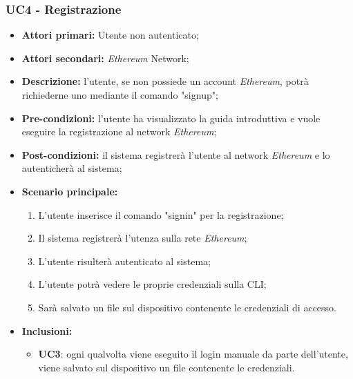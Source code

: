 \subsubsection{UC4 - Registrazione}
\begin{itemize}
	\item \textbf{Attori primari:} Utente non autenticato;
	\item \textbf{Attori secondari:} \textit{Ethereum\glo} Network;
	\item \textbf{Descrizione:} l'utente, se non possiede un account \textit{Ethereum\glos}, potrà richiederne uno mediante il comando "signup"; 
	\item \textbf{Pre-condizioni:} l'utente ha visualizzato la guida introduttiva e vuole eseguire la registrazione al network \textit{Ethereum};
	\item \textbf{Post-condizioni:} il sistema registrerà l'utente al network \textit{Ethereum\glo} e lo autenticherà al sistema;
	\item \textbf{Scenario principale:} 
	\begin{enumerate}
		\item L'utente inserisce il comando "signin" per la registrazione;
		\item Il sistema registrerà l'utenza sulla rete \textit{Ethereum\glos};
		\item L'utente risulterà autenticato al sistema;
		\item L'utente potrà vedere le proprie credenziali sulla CLI\glos;
		\item Sarà salvato un file sul dispositivo contenente le credenziali di accesso.
	\end{enumerate}
	\item \textbf{Inclusioni:}
	\begin{itemize}
		\item\textbf{UC3}: ogni qualvolta viene eseguito il login manuale da parte dell'utente, viene salvato sul dispositivo un file contenente le credenziali.
	\end{itemize} 
\end{itemize}